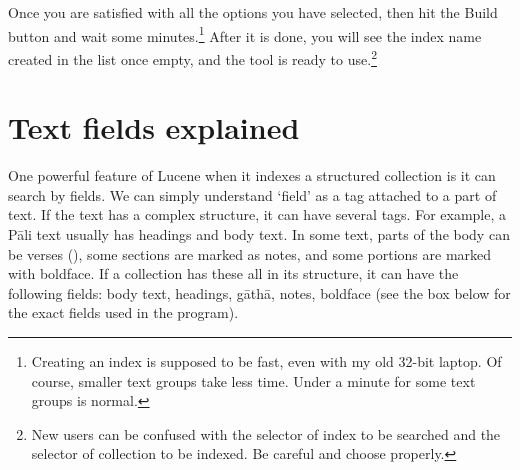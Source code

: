 \newpage
{}

Once you are satisfied with all the options you have selected, then hit the {\faSix {}} Build button and wait some minutes.\footnote{Creating an index is supposed to be fast, even with my old 32-bit laptop. Of course, smaller text groups take less time. Under a minute for some text groups is normal.} After it is done, you will see the index name created in the list once empty, and the tool is ready to use.\footnote{New users can be confused with the selector of index to be searched and the selector of collection to be indexed. Be careful and choose properly.}


\section{Text fields explained}\label{sect:textfields}

One powerful feature of Lucene when it indexes a structured collection is it can search by fields. We can simply understand `field' as a tag attached to a part of text. If the text has a complex structure, it can have several tags. For example, a Pāli text usually has headings and body text. In some text, parts of the body can be verses (), some sections are marked as notes, and some portions are marked with boldface. If a collection has these all in its structure, it can have the following fields: body text, headings, gāthā, notes, boldface (see the box below for the exact fields used in the program).

